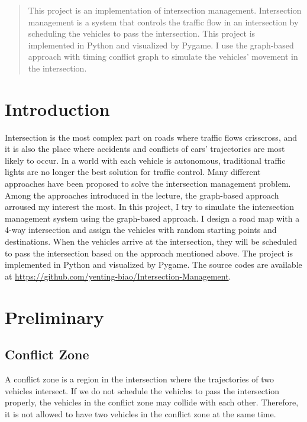 \documentclass{article}
\begin{document}
\setlength{\columnsep}{0.8cm}
\begin{multicols*}{2}

\begin{abstract}
    This project is an implementation of intersection management. Intersection management is a system that controls the traffic flow in an intersection by scheduling the vehicles to pass the intersection. This project is implemented in Python and visualized by Pygame. I use the graph-based approach with timing conflict graph to simulate the vehicles' movement in the intersection.
    
\end{abstract}
    \section{Introduction} 
    Intersection is the most complex part on roads where traffic flows crisscross, and it is also the place where accidents and conflicts of cars' trajectories are most likely to occur. In a world with each vehicle is autonomous, traditional traffic lights are no longer the best solution for traffic control. Many different approaches have been proposed to solve the intersection management problem. Among the approaches introduced in the lecture, the graph-based approach arroused my interest the most. In this project, I try to simulate the intersection management system using the graph-based approach. I design a road map with a 4-way intersection and assign the vehicles with random starting points and destinations. When the vehicles arrive at the intersection, they will be scheduled to pass the intersection based on the approach mentioned above. The project is implemented in Python and visualized by Pygame. The source codes are available at \url{https://github.com/yenting-biao/Intersection-Management}.

    \section{Preliminary}
    \subsection{Conflict Zone}
    A conflict zone is a region in the intersection where the trajectories of two vehicles intersect. If we do not schedule the vehicles to pass the intersection properly, the vehicles in the conflict zone may collide with each other. Therefore, it is not allowed to have two vehicles in the conflict zone at the same time.

\end{multicols*}
\end{document}
